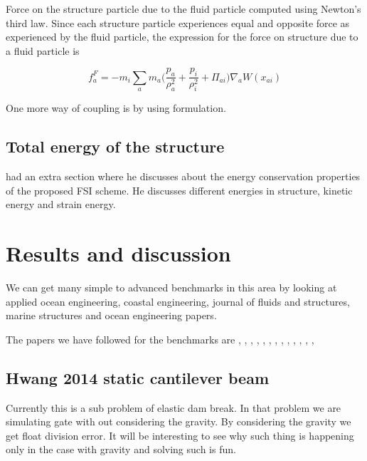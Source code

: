 \documentclass[preprint,12pt]{elsarticle}
\begin{document}
Force on the structure particle due to the fluid particle computed using
Newton's third law. Since each structure particle experiences equal and
opposite force as experienced by the fluid particle, the expression for the
force on structure due to a fluid particle is

\begin{equation}
  f_a^F = -m_i \sum_{a} m_a \bigg(\frac{p_a}{\rho_{a}^2} +
  \frac{p_i}{\rho_{i}^2} + \Pi_{ai} \bigg) \nabla_{a} W(x_{ai})
\end{equation}


One more way of coupling is by using \citet{khayyer2018enhanced} formulation.



\subsection{Total energy of the structure}
\label{sec:total-energy-struct}

\citet{khayyer2018enhanced} had an extra section where he discusses about the
energy conservation properties of the proposed FSI scheme. He discusses
different energies in structure, kinetic energy and strain energy.



\section{Results and discussion}
\label{sec:results}

We can get many simple to advanced benchmarks in this area by looking at
applied ocean engineering, coastal engineering, journal of fluids and
structures, marine structures and ocean engineering papers.


The papers we have followed for the benchmarks are
\citet{sun2021accurate}, \citet{yang2016numerical}, \citet{Sun2019study},
\citet{He2017coupled}, \citet{khayyer2018enhanced}, \citet{sun2015numerical},
\citet{wang2020scale}, \citet{peng2021coupling}, \citet{zhang2021deltasph},
\citet{zhan2019stabilized}, \citet{khayyer2021multi},
\citet{long2021coupling}, \citet{ng2020coupled},


\subsection{Hwang 2014 static cantilever beam}
\label{sec:hwang-2014-static-cantilever-beam}
Currently this is a sub problem of elastic dam break. In that problem we are
simulating gate with out considering the gravity. By considering the gravity
we get float division error. It will be interesting to see why such thing is
happening only in the case with gravity and solving such is fun.
\end{document}
